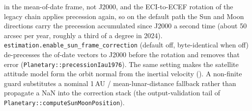 \documentclass[main.tex]{subfiles}
\begin{document}
in the mean-of-date frame, not J2000, and the ECI-to-ECEF rotation of the
legacy chain applies precession again, so on the default path the Sun and
Moon directions carry the precession accumulated since J2000 a second time
(about 50\,arcsec per year, roughly a third of a degree in 2024).
\texttt{estimation.enable\_sun\_frame\_correction} (default off,
byte-identical when off) de-precesses the of-date vectors to J2000 before
the rotation and removes that error (\texttt{Planetary::precessionIau1976}).
The same setting makes the satellite attitude model form the orbit normal
from the inertial velocity
().  A non-finite guard substitutes a nominal 1\,AU / mean-lunar-distance
fallback rather than propagate a NaN into the correction stack (the
output-validation tail of \texttt{Planetary::computeSunMoonPosition}).

\ifSubfilesClassLoaded{\printbibliography}{}
\end{document}
